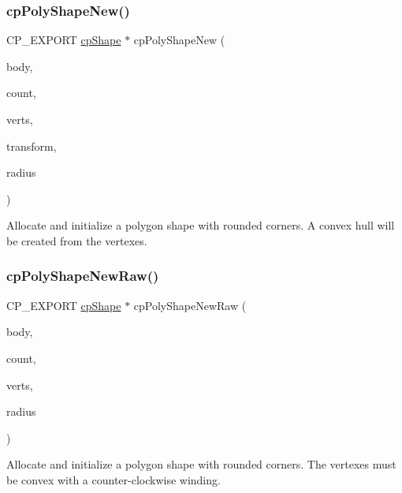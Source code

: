 \subsubsection{\texorpdfstring{cp\+Poly\+Shape\+New()}{cpPolyShapeNew()}}
{\footnotesize\ttfamily C\+P\+\_\+\+E\+X\+P\+O\+RT \hyperlink{structcpShape}{cp\+Shape} $\ast$ cp\+Poly\+Shape\+New (\begin{DoxyParamCaption}\item[{\hyperlink{structcpBody}{cp\+Body} $\ast$}]{body,  }\item[{int}]{count,  }\item[{const \hyperlink{structcpVect}{cp\+Vect} $\ast$}]{verts,  }\item[{\hyperlink{structcpTransform}{cp\+Transform}}]{transform,  }\item[{cp\+Float}]{radius }\end{DoxyParamCaption})}

Allocate and initialize a polygon shape with rounded corners. A convex hull will be created from the vertexes. \mbox{\label{group__cpPolyShape_ga9f913d3ac1991e4d248b1a51357a176a}} 
\subsubsection{\texorpdfstring{cp\+Poly\+Shape\+New\+Raw()}{cpPolyShapeNewRaw()}}
{\footnotesize\ttfamily C\+P\+\_\+\+E\+X\+P\+O\+RT \hyperlink{structcpShape}{cp\+Shape} $\ast$ cp\+Poly\+Shape\+New\+Raw (\begin{DoxyParamCaption}\item[{\hyperlink{structcpBody}{cp\+Body} $\ast$}]{body,  }\item[{int}]{count,  }\item[{const \hyperlink{structcpVect}{cp\+Vect} $\ast$}]{verts,  }\item[{cp\+Float}]{radius }\end{DoxyParamCaption})}

Allocate and initialize a polygon shape with rounded corners. The vertexes must be convex with a counter-\/clockwise winding. 